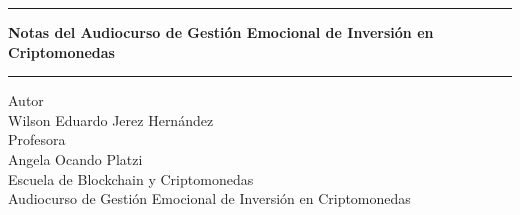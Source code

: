 \pagestyle{empty}
\begin{center}
\begin{figure}[h]
\centering


\end{figure}
\Large
\hrule
\vspace{4mm}
\textbf{Notas del Audiocurso de Gestión Emocional de Inversión en Criptomonedas }\\

\vspace{4mm}
\hrule
\large
\vfill
Autor\\

Wilson Eduardo Jerez Hernández \\
\vfill
Profesora\\


Angela Ocando
\vfill
Platzi\\
Escuela de Blockchain y Criptomonedas\\
Audiocurso de Gestión Emocional de Inversión en Criptomonedas\\
\end{center}
\newpage


\tableofcontents
\newpage